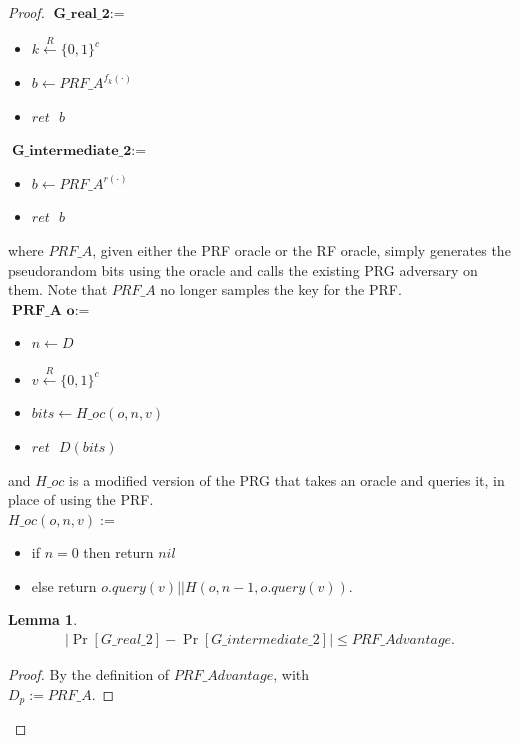 \documentclass[12pt,lot, lof]{puthesis}
\newenvironment{game}
{ \begin{itemize}[noitemsep,nolistsep] 
}
{ \end{itemize}                  }
\newcommand{\s} {\textrm{ }}
\newcommand{\bt}{\{0,1\}}
\newtheorem{lem}{Lemma}[thm]
\begin{document}
\begin{proof}
$\textbf{G\_real\_2} := $
\begin{game}
\item[] $k \xleftarrow{R} \bt^c$
\item[] $b \leftarrow PRF\_A^{f_k(\cdot)}$ 
\item[] $ret \s b$ \\
\end{game}

$\textbf{G\_intermediate\_2} := $
\begin{game}
\item[] $b \leftarrow PRF\_A^{r(\cdot)}$ 
\item[] $ret \s b$ \\
\end{game}

where $PRF\_A$, given either the PRF oracle or the RF oracle, simply generates the pseudorandom bits using the oracle and calls the existing PRG adversary on them. Note that $PRF\_A$ no longer samples the key for the PRF. \\

$\textbf{PRF\_A o} := $
\begin{game}
\item[] $n \leftarrow D$
\item[] $v \xleftarrow{R} \bt^c$
\item[] $bits \leftarrow H\_oc(o,n, v)$ 
\item[] $ret \s D(bits)$ \\
\end{game}

and $H\_oc$ is a modified version of the PRG that takes an oracle and queries it, in place of using the PRF.\\

$H\_{oc}(o, n, v) :=$
\begin{game}
\item[] if $n = 0$ then return $nil$
\item[] else return $o.query(v) || H(o, n-1, o.query(v)).$
\end{game}

\begin{lem} \begin{gather*}|\Pr[G\_real\_2] - \Pr[G\_intermediate\_2]| \leq PRF\_Advantage.\end{gather*} \end{lem}
\begin{proof} By the definition of $PRF\_Advantage$, with \\ $D_p := PRF\_A$. \end{proof}


\end{proof}
\end{document}
